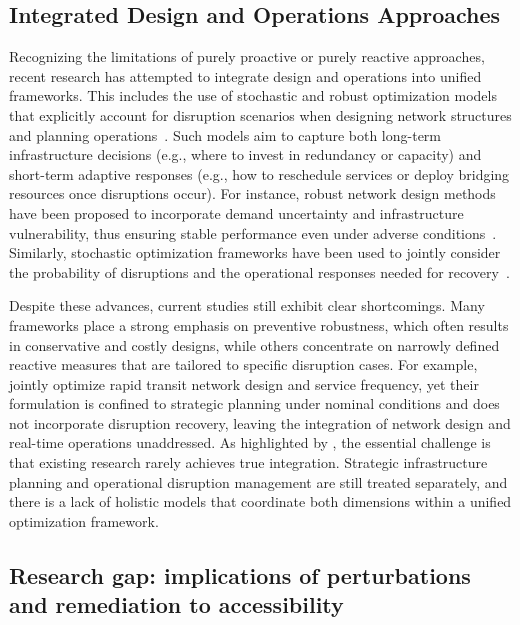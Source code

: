 \documentclass[3p,times,procedia]{elsarticle}
\begin{document}
\subsection{Integrated Design and Operations Approaches}

Recognizing the limitations of purely proactive or purely reactive approaches, 
recent research has attempted to integrate design and operations into unified frameworks. 
This includes the use of stochastic and robust optimization models that explicitly account for disruption scenarios 
when designing network structures and planning operations~\citep{Cadarso2015,CadarsoMarin2014b}.
Such models aim to capture both long-term infrastructure decisions (e.g., where to invest in redundancy or capacity) 
and short-term adaptive responses (e.g., how to reschedule services or deploy bridging resources once disruptions occur). 
For instance, robust network design methods have been proposed to incorporate demand uncertainty and infrastructure vulnerability, 
thus ensuring stable performance even under adverse conditions~\citep{CadarsoMarin2014b,AnLo2016}. 
Similarly, stochastic optimization frameworks have been used to jointly consider the probability of disruptions 
and the operational responses needed for recovery~\citep{Cadarso2015}. 

Despite these advances, current studies still exhibit clear shortcomings. 
Many frameworks place a strong emphasis on preventive robustness, which often results in conservative and costly designs, 
while others concentrate on narrowly defined reactive measures that are tailored to specific disruption cases. 
For example, \citet{LopezRamos2017} jointly optimize rapid transit network design and service frequency, yet their formulation is confined to strategic planning under nominal conditions and does not incorporate disruption recovery, leaving the integration of network design and real-time operations unaddressed.
As highlighted by \citet{Besinovic2020,Lusby2018}, the essential challenge is that existing research rarely achieves true integration. 
Strategic infrastructure planning and operational disruption management are still treated separately, 
and there is a lack of holistic models that coordinate both dimensions within a unified optimization framework.

\subsection{Research gap: implications of perturbations and remediation to accessibility}
\end{document}
